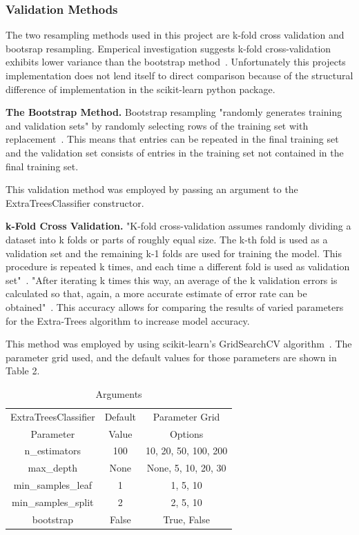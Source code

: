 \documentclass[10pt,sigconf,letterpaper,nonacm]{acmart}
\begin{document}
\subsubsection{Validation Methods} The two resampling methods used in this project are
k-fold cross validation and bootsrap resampling. Emperical investigation suggests k-fold
cross-validation exhibits lower variance than the bootstrap method~\cite{Ljumovic2015}.
Unfortunately this projects implementation does not lend itself to direct comparison
because of the structural difference of implementation in the scikit-learn python package.
\par\textbf{The Bootstrap Method.} Bootstrap resampling "randomly generates training and
validation sets" by randomly selecting rows of the training set with
replacement~\cite{Nakatsu2021}. This means that entries can be repeated in the final
training set and the validation set consists of entries in the training set not contained
in the final training set.
\par This validation method was employed by passing an argument to the
ExtraTreesClassifier constructor.
\par\textbf{k-Fold Cross Validation.} "K-fold cross-validation assumes randomly
dividing a dataset into k folds or parts of roughly equal size. The k-th fold is used as
a validation set and the remaining k-1 folds are used for training the model. This
procedure is repeated k times, and each time a different fold is used as validation
set"~\cite{Ljumovic2015}. "After iterating k times this way, an average of the k
validation errors is calculated so that, again, a more accurate estimate of error rate
can be obtained"~\cite{Nakatsu2021}. This accuracy allows for comparing the results of varied
parameters for the Extra-Trees algorithm to increase model accuracy.
\par This method was employed by using scikit-learn's GridSearchCV
algorithm~\cite{sklearn111}. The parameter grid used, and the default values for those
parameters are shown in Table 2.

\begin{table}
  \caption{Arguments}
  \begin{tabular}{c|c|c}
    ExtraTreesClassifier & Default & Parameter Grid\\
    Parameter & Value & Options\\
    \midrule
    n\_estimators & 100 & 10, 20, 50, 100, 200\\
    max\_depth & None & None, 5, 10, 20, 30\\
    min\_samples\_leaf & 1 & 1, 5, 10\\
    min\_samples\_split & 2 & 2, 5, 10\\
    bootstrap & False & True, False
  \end{tabular}
\end{table}
\end{document}
